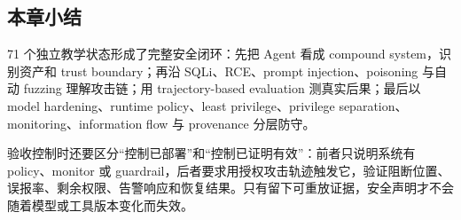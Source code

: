 \subsection{本章小结}
71 个独立教学状态形成了完整安全闭环：先把 Agent 看成 compound system，识别资产和 trust boundary；再沿 SQLi、RCE、prompt injection、poisoning 与自动 fuzzing 理解攻击链；用 trajectory-based evaluation 测真实后果；最后以 model hardening、runtime policy、least privilege、privilege separation、monitoring、information flow 与 provenance 分层防守。

验收控制时还要区分“控制已部署”和“控制已证明有效”：前者只说明系统有 policy、monitor 或 guardrail，后者要求用授权攻击轨迹触发它，验证阻断位置、误报率、剩余权限、告警响应和恢复结果。只有留下可重放证据，安全声明才不会随着模型或工具版本变化而失效。

